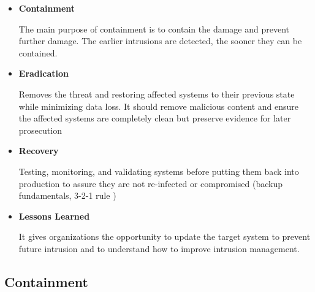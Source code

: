 \begin{itemize}
   
   \item \textbf{Containment}
   
   The main purpose of containment is to contain the
   damage and prevent further damage.
   The earlier intrusions are
   detected, the sooner they can be contained.
   \item \textbf{Eradication}
   
   Removes the threat and restoring affected systems
   to their previous state while minimizing data loss.
   It should remove
   malicious content and ensure the affected systems are completely
   clean but preserve evidence for later prosecution
   \item \textbf{Recovery}
   
   Testing, monitoring, and validating systems before
   putting them back into production to assure they are not re-infected or compromised (backup fundamentals, 3-2-1 rule )
   \item \textbf{Lessons Learned}
   
   It gives organizations the opportunity to update
   the target system to prevent future intrusion and to understand
   how to improve intrusion management.
\end{itemize}

\subsection{Containment}

